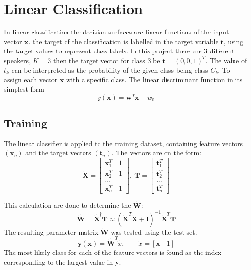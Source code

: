 \section*{Linear Classification}
In linear classification the decision surfaces are linear functions of the input vector $\mathbf{x}$.
the target of the classification is labelled in the target variable $\mathbf{t}$, using the target values to represent class labels.
In this project there are 3 different speakers, $K = 3$ then the target vector for class 3 be $\mathbf{t} = (0, 0, 1)^T$.
The value of $t_k$ can be interpreted as the probability of the given class being class $C_k$.
To assign each vector $\mathbf{x}$ with a specific class.
The linear discriminant function in its simplest form
\begin{equation}
y(\mathbf{x}) = \mathbf{w}^T \mathbf{x}+w_0
\label{eq:lin_output}
\end{equation}

\subsection*{Training}
The linear classifier is applied to the training dataset, containing feature vectors $(\mathbf{x}_n)$ and the target vectors $(\mathbf{t}_n)$.
The vectors are on the form:
\begin{equation}
\mathbf{\tilde{X}}=\left[ \begin{array}{c}\mathbf{x}_1^T \quad 1\\
\mathbf{x}_2^T \quad 1\\
...\\ 
\mathbf{x}_n^T \quad 1 \end{array} \right],
\;
\mathbf{T}=\left[ \begin{array}{c}
\mathbf{t}_1^T\\ 
\mathbf{t}_2^T\\ 
...\\
\mathbf{t}_n^T
\end{array} \right]
\label{eq:linearVectors}  
\end{equation} 

This calculation are done to determine the $\tilde{\mathbf{W}}$:
\begin{equation}
\tilde{\mathbf{W}} = \tilde{\mathbf{X}}^\dagger \mathbf{T} \approx  (\tilde{\mathbf{X}}^T \tilde{\mathbf{X}}+\mathbf{I})^{-1} \tilde{\mathbf{X}}^T\mathbf{T}
\label{eq:weightVector}  
\end{equation}
The resulting parameter matrix $ \tilde{\mathbf{W}} $ was tested using the test set.
\begin{equation}
\mathbf{y}(\mathbf{x})=\tilde{\mathbf{W}}^T \tilde{x}, \qquad \tilde{x}= \left[ 
\mathbf{x} \quad 1 
\right]
\end{equation}
The most likely class for each of the feature vectors is found as the index corresponding to the largest value in $ \mathbf{y} $.

